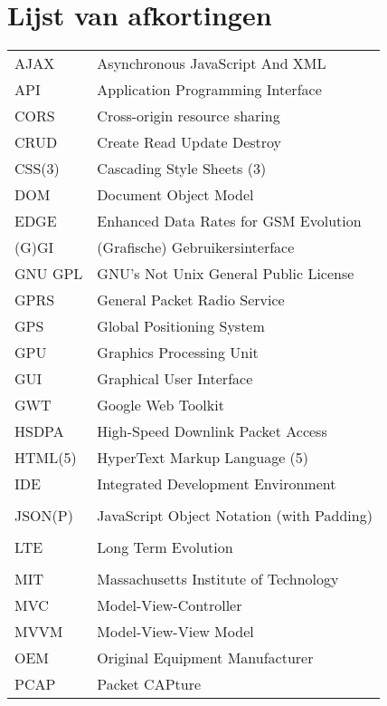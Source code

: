 \documentclass[master=cws,dutch,masteroption={vs,gs},inputenc=utf8]{kulemt}
\begin{document}
\chapter{Lijst van afkortingen}
\begin{flushleft}
  \renewcommand{\arraystretch}{1.1}
  \begin{longtable}{p{2cm} l}
     AJAX & Asynchronous JavaScript And XML \\
     API & Application Programming Interface \\
     CORS & Cross-origin resource sharing \\
     CRUD & Create Read Update Destroy \\
     CSS(3) & Cascading Style Sheets (3) \\
     DOM & Document Object Model \\
     EDGE & Enhanced Data Rates for GSM Evolution \\
     (G)GI & (Grafische) Gebruikersinterface \\
     GNU GPL & GNU's Not Unix General Public License \\
     GPRS & General Packet Radio Service \\
     GPS & Global Positioning System \\
     GPU & Graphics Processing Unit \\
     GUI & Graphical User Interface \\
     GWT & Google Web Toolkit \\
     HSDPA & High-Speed Downlink Packet Access \\
     HTML(5) & HyperText Markup Language (5) \\
     IDE & Integrated Development Environment \\
     \jqma{} & \jqm{} \\
     JSON(P)  & JavaScript Object Notation (with Padding) \\
     \kendoa{} & \kendo{} \\
     LTE & Long Term Evolution \\
     \lungoa{} & \lungo{} \\
     MIT & Massachusetts Institute of Technology \\
     MVC & Model-View-Controller \\
     MVVM & Model-View-View Model \\
     OEM & Original Equipment Manufacturer \\
     PCAP & Packet CAPture \\

\end{longtable}
\end{flushleft}
\end{document}
